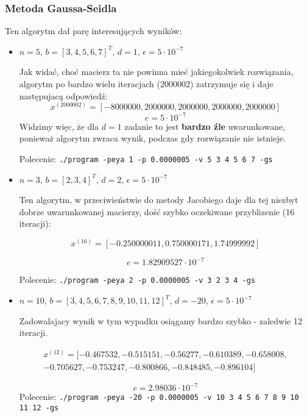 \documentclass[a4paper,11pt]{article}
\begin{document}
\subsubsection{Metoda Gaussa-Seidla}
  Ten algorytm dał parę interesujących wyników:
  \begin{itemize}
    \item $ n = 5 $, $ b = [3, 4, 5, 6, 7]^T$, $ d = 1 $, $ \epsilon = 5 \cdot 10^{-7} $
    
      Jak widać, choć macierz ta nie powinna mieć jakiegokolwiek rozwiązania, algorytm po bardzo wielu iteracjach
       (2000002) zatrzymuje się i daje następujacą odpowiedź:
      $$ x^{(2000002)} = [-8000000, 2000000, 2000000, 2000000, 2000000]$$
      $$ e = 5 \cdot 10^{-7} $$
      Widzimy więc, że dla $ d = 1 $ zadanie to jest \textbf{bardzo źle} uwarunkowane, ponieważ algorytm
      zwraca wynik, podczas gdy rozwiązanie nie istnieje.
      
      Polecenie: \texttt{./program -peya 1 -p 0.0000005 -v 5 3 4 5 6 7 -gs}
      
    \item $ n = 3 $, $ b = [2, 3, 4]^T$, $ d = 2 $, $ \epsilon = 5 \cdot 10^{-7} $
    
      Ten algorytm, w przeciwieństwie do metody Jacobiego daje dla tej niezbyt 
      dobrze uwarunkowanej macierzy, dość szybko oczekiwane przyblizenie (16 iteracji):
      
      $$ x^{(16)} = [-0.250000011, 0.750000171, 1.74999992] $$
      
      $$ e = 1.82909527 \cdot 10^{-7} $$
      
      Polecenie: \texttt{./program -peya 2 -p 0.0000005 -v 3 2 3 4 -gs}
      
    \item $ n = 10 $, $ b = [3, 4, 5, 6, 7, 8, 9, 10, 11, 12]^T$, $ d = -20 $, $ \epsilon = 5 \cdot 10^{-7} $
      
      Zadowalajacy wynik w tym wypadku osiągamy bardzo szybko - zaledwie 12 iteracji.
      
      \begin{align*}
        x^{(12)} = [-0.467532, -0.515151, -0.56277, -0.610389, -0.658008, \\ -0.705627, -0.753247, -0.800866, -0.848485, -0.896104]
      \end{align*}
      
      $$ e = 2.98036 \cdot 10^{-7} $$
      Polecenie: \texttt{./program -peya -20 -p 0.0000005 -v 10 3 4 5 6 7 8 9 10 11 12 -gs}
      

\end{itemize}
\end{document}
